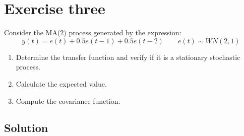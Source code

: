 \section{Exercise three}

Consider the MA($2$) process generated by the expression:
\[y(t)=e(t)+0.5e(t-1)+0.5e(t-2) \qquad e(t) \sim WN(2,1)\]
\begin{enumerate}
    \item Determine the transfer function and verify if it is a stationary stochastic process.
    \item Calculate the expected value.
    \item Compute the covariance function.
\end{enumerate}

\subsection*{Solution}
